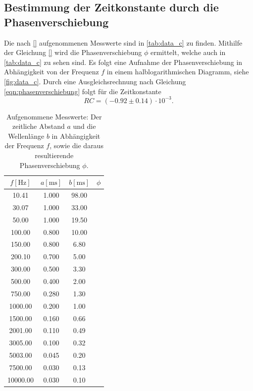 \subsection{Bestimmung der Zeitkonstante durch die Phasenverschiebung}
\label{subsec:Aufgabe_C}
Die nach \autoref{} aufgenommenen Messwerte sind in \autoref{tab:data_c} zu finden.
Mithilfe der Gleichung \autoref{} wird die Phasenverschiebung $\phi$ ermittelt, welche auch in \autoref{tab:data_c} zu sehen sind.
Es folgt eine Aufnahme der Phasenverschiebung in Abhängigkeit von der Frequenz $f$ in einem halblogarithmischen Diagramm, siehe \autoref{fig:data_c}.
Durch eine Ausgleichsrechnung nach Gleichung \eqref{eqn:phasenverschiebung} folgt für die Zeitkonstante
\begin{equation*}
  RC = (-0.92 \pm 0.14) \cdot 10^{-3}.
\end{equation*}

\begin{table}
  \centering
  \caption{Aufgenommene Messwerte: Der zeitliche  Abstand $a$ und die Wellenlänge $b$ in Abhängigkeit der Frequenz $f$, sowie die daraus resultierende Phasenverschiebung $\phi$.}
  \label{tab:data_c}
  \begin{tabular}{c c c c}
    \toprule
    $f [\si{\hertz}]$ & $a [\si{\milli\second}]$ & $b [\si{\milli\second}]$ & $\phi$ \\
    \midrule
    10.41       &     1.000     &   98.00   &   \\
    30.07       &     1.000     &   33.00   &   \\
    50.00       &     1.000     &   19.50   &   \\
    100.00      &     0.800     &   10.00   &   \\
    150.00      &     0.800     &    6.80   &   \\
    200.10      &     0.700     &    5.00   &   \\
    300.00      &     0.500     &    3.30   &   \\
    500.00      &     0.400     &    2.00   &   \\
    750.00      &     0.280     &    1.30   &   \\
    1000.00     &     0.200     &    1.00   &   \\
    1500.00     &     0.160     &    0.66   &   \\
    2001.00     &     0.110     &    0.49   &   \\
    3005.00     &     0.100     &    0.32   &   \\
    5003.00     &     0.045     &    0.20   &   \\
    7500.00     &     0.030     &    0.13   &   \\
    10000.00    &     0.030     &    0.10   &   \\
    \bottomrule
  \end{tabular}
\end{table}

